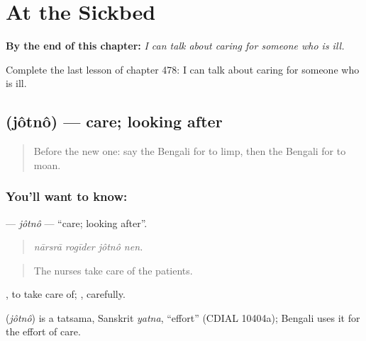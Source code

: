 
\chapter{At the Sickbed}
\label{ch:bn-at-the-sickbed}

\begin{chapteropening}
\textbf{By the end of this chapter:} \emph{I can talk about caring for someone who is ill.}

Complete the last lesson of chapter 478: I can talk about caring for someone who is ill.
\end{chapteropening}

\section[\texorpdfstring{\bn{যত্ন} (jôtnô)}{যত্ন (jôtnô)}]{ (jôtnô) — care; looking after}

\label{lesson:BN-C478-jotno}



\begin{quote}
Before the new one: say the Bengali for to limp, then the Bengali for to moan.
\end{quote}

\subsection*{You'll want to know: }
\textbf{} — \emph{jôtnô} — \textquotedblleft{}care; looking after\textquotedblright{}.

\begin{quote}
   
\end{quote}

\begin{quote}
\emph{nārsrā rogīder jôtnô nen.}
\end{quote}

\begin{quote}
The nurses take care of the patients.
\end{quote}

 , to take care of;  , carefully.

\begin{cousinweb}
\textbf{} (\emph{jôtnô}) is a tatsama, Sanskrit \emph{yatna}, \textquotedblleft{}effort\textquotedblright{} (CDIAL 10404a); Bengali uses it for the effort of care.
\end{cousinweb}

